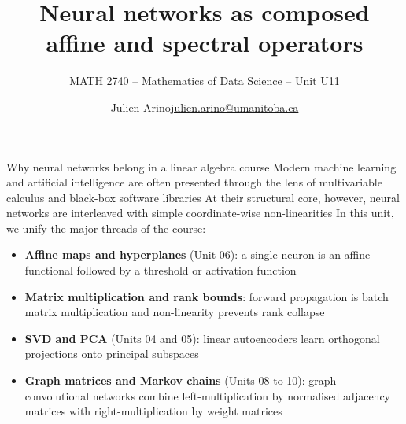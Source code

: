 \documentclass[aspectratio=169]{beamer}\usepackage[]{graphicx}\usepackage[]{xcolor}
\subtitle{MATH 2740 -- Mathematics of Data Science -- Unit U11}
\author{\texorpdfstring{Julien Arino\newline\url{julien.arino@umanitoba.ca}}{Julien Arino}}
\institute{Department of Mathematics @ University of Manitoba}
\title{Neural networks as composed affine and spectral operators}
\begin{document}
\setcounter{theorem}{169}

\SStitlepage
\SSoutlinepage


\begin{frame}{Why neural networks belong in a linear algebra course}
Modern machine learning and artificial intelligence are often presented through the lens of multivariable calculus and black-box software libraries
\vfill
At their structural core, however, neural networks are  interleaved with simple coordinate-wise non-linearities
\vfill
In this unit, we unify the major threads of the course:
\begin{itemize}
\item \textbf{Affine maps and hyperplanes} (Unit 06): a single neuron is an affine functional followed by a threshold or activation function
\item \textbf{Matrix multiplication and rank bounds}: forward propagation is batch matrix multiplication and non-linearity prevents rank collapse
\item \textbf{SVD and PCA} (Units 04 and 05): linear autoencoders learn orthogonal projections onto principal subspaces
\item \textbf{Graph matrices and Markov chains} (Units 08 to 10): graph convolutional networks combine left-multiplication by normalised adjacency matrices with right-multiplication by weight matrices
\end{itemize}
\end{frame}



\end{document}
